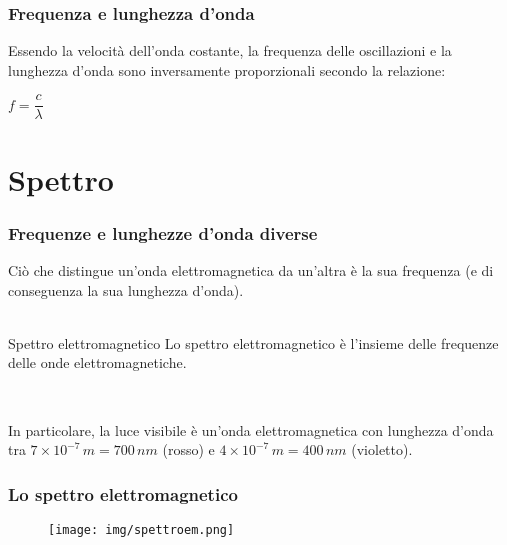 \documentclass[]{beamer}
\theoremstyle{plain}
\begin{document}
\begin{frame}
  \frametitle{Frequenza e lunghezza d'onda}
  Essendo la velocità dell'onda costante, la frequenza delle oscillazioni e la lunghezza d'onda sono inversamente proporzionali secondo la relazione:
   \begin{center}
   \colorbox{marroncino!30}{$ f = \dfrac{c}{\lambda} $}
   \end{center}
\end{frame}


\section{Spettro}

\begin{frame}
\frametitle{Frequenze e lunghezze d'onda diverse}
  Ciò che distingue un'onda elettromagnetica da un'altra è la sua frequenza (e di conseguenza la sua lunghezza d'onda).\\\pause~\\
  \begin{block}{Spettro elettromagnetico}
    Lo spettro elettromagnetico è l'insieme delle frequenze delle onde elettromagnetiche.
  \end{block}\pause
  
  ~
  
  In particolare, la \alert{luce visibile} è un'onda elettromagnetica con lunghezza d'onda tra $ 7 \times 10^{-7} \, m = 700 \, nm $ (rosso) e $ 4 \times 10^{-7} \, m = 400 \, nm $ (violetto).
\end{frame}


\begin{frame}
\frametitle{Lo spettro elettromagnetico}
  \begin{figure}
  \texttt{[image: img/spettroem.png]}
  \end{figure}
\end{frame}
\end{document}
